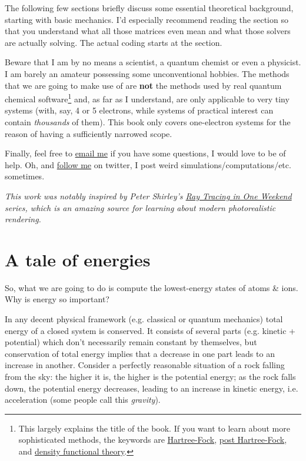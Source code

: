 \documentclass{article}
\begin{document}
The following few sections briefly discuss some essential theoretical background, starting with basic mechanics. I'd especially recommend reading the  section so that you understand what all those matrices even mean and what those solvers are actually solving. The actual coding starts at the  section.

Beware that I am by no means a scientist, a quantum chemist or even a physicist. I am barely an amateur possessing some unconventional hobbies. The methods that we are going to make use of are \textbf{not} the methods used by real quantum chemical software\footnote{This largely explains the title of the book. If you want to learn about more sophisticated methods, the keywords are \href{https://en.wikipedia.org/wiki/Hartree\%E2\%80\%93Fock_method}{Hartree-Fock}, \href{https://en.wikipedia.org/wiki/Post\%E2\%80\%93Hartree\%E2\%80\%93Fock}{post Hartree-Fock}, and \href{https://en.wikipedia.org/wiki/Density_functional_theory}{density functional theory}.} and, as far as I understand, are only applicable to very tiny systems (with, say, 4 or 5 electrons, while systems of practical interest can contain \textit{thousands} of them). This book only covers one-electron systems for the reason of having a sufficiently narrowed scope.

Finally, feel free to \href{mailto:lisyarus@gmail.com}{email me} if you have some questions, I would love to be of help. Oh, and \href{https://twitter.com/lisyarus}{follow me} on twitter, I post weird simulations/computations/etc. sometimes.

\bigbreak
\textit{This work was notably inspired by Peter Shirley's \href{https://raytracing.github.io}{Ray Tracing in One Weekend} series, which is an amazing source for learning about modern photorealistic rendering.}

\newpage

\section{A tale of energies}

So, what we are going to do is compute the lowest-energy states of atoms \& ions. Why is energy so important?

In any decent physical framework (e.g. classical or quantum mechanics) total energy of a closed system is conserved. It consists of several parts (e.g. kinetic + potential) which don't necessarily remain constant by themselves, but conservation of total energy implies that a decrease in one part leads to an increase in another. Consider a perfectly reasonable situation of a rock falling from the sky: the higher it is, the higher is the potential energy; as the rock falls down, the potential energy decreases, leading to an increase in kinetic energy, i.e. acceleration (some people call this \textit{gravity}).
\end{document}
